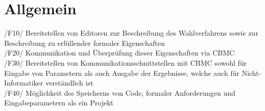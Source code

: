 \documentclass[a4paper]{scrreprt}
\begin{document}
\section{Allgemein}
/F10/ Bereitstellen von Editoren zur Beschreibung des Wahlverfahrens sowie zur Beschreibung zu erfüllender formaler Eigenschaften \\
/F20/ Kommunikation und Überprüfung dieser Eigenschaften via CBMC \\
/F30/ Bereitstellen von Kommunikationsschnittstellen mit CBMC sowohl für Eingabe von Parametern als auch Ausgabe der Ergebnisse, welche auch für Nicht-Informatiker verständlich ist \\
/F40/ Möglichkeit des Speicherns von Code, formaler Anforderungen und Eingabeparametern als ein Projekt \\
\end{document}
